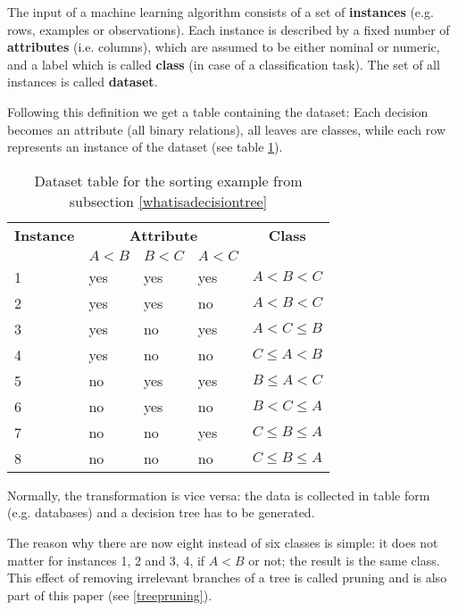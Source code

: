 \begin{definition}
    The input of a machine learning algorithm consists of a set of \textbf{instances} (e.g. rows, examples or observations). Each instance is described by a fixed number of \textbf{attributes} (i.e. columns), which are assumed to be either nominal or numeric, and a label which is called \textbf{class} (in case of a classification task). The set of all instances is called \textbf{dataset}.
\end{definition}

Following this definition we get a table containing the dataset: Each decision becomes an attribute (all binary relations), all leaves are classes, while each row represents an instance of the dataset (see table \ref{tab:decisiontable}).

\begin{table}[!h] \centering
\begin{tabular}{|l| l l l |l|} \hline
    \textbf{Instance} & \multicolumn{3}{c|}{\textbf{Attribute}} & \multicolumn{1}{c|}{\textbf{Class}}\\ 
    & $A<B$ & $B<C$ & $A<C$ &  \\ \hline
    1 & yes & yes & yes & $A < B < C$ \\ 
    2 & yes & yes & no & $A < B < C$ \\
    3 & yes & no & yes & $A < C \leq B$ \\
    4 & yes & no & no & $C \leq A < B$ \\
    5 & no & yes & yes & $B \leq A < C$ \\ 
    6 & no & yes & no & $B < C \leq A$ \\
    7 & no & no & yes & $C \leq B \leq A$ \\
    8 & no & no & no & $C \leq B \leq A$ \\ \hline
\end{tabular}
\caption{Dataset table for the sorting example from subsection \ref{whatisadecisiontree}}
\label{tab:decisiontable}
\end{table}

Normally, the transformation is vice versa: the data is collected in table form (e.g. databases) and a decision tree has to be generated. 

The reason why there are now eight instead of six classes is simple: it does not matter for instances 1, 2 and 3, 4, if $A<B$ or not; the result is the same class. This effect of removing irrelevant branches of a tree is called pruning and is also part of this paper (see \ref{treepruning}). 


